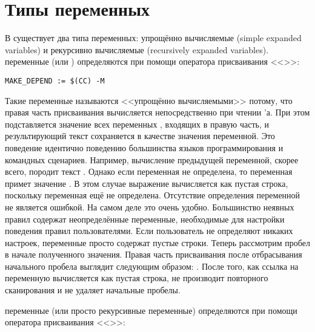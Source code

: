 \section{Типы переменных}
\label{var_types}

В \GNUmake{} существует два типа переменных: упрощённо вычисляемые
(simple expanded variables) и рекурсивно вычисляемые (recursively
expanded variables).  переменные (или
) определяются при помощи оператора
присваивания <<\command{:=}>>:

{\footnotesize
\begin{verbatim}
MAKE_DEPEND := $(CC) -M
\end{verbatim}
}

Такие переменные называются <<упрощённо вычисляемыми>> потому, что
правая часть присваивания вычисляется непосредственно при чтении
\Makefile{}'а. При этом подставляется значение всех переменных
\GNUmake{}, входящих в правую часть, и результирующий текст
сохраняется в качестве значения переменной. Это поведение идентично
поведению большинства языков программирования и командных сценариев.
Например, вычисление предыдущей переменной, скорее всего, породит
текст . Однако если переменная  не
определена, то переменная  примет значение
. В этом случае выражение 
вычисляется как пустая строка, поскольку переменная  ещё
не определена. Отсутствие определения переменной не является ошибкой.
На самом деле это очень удобно. Большинство неявных правил содержат
неопределённые переменные, необходимые для настройки поведения правил
пользователями. Если пользователь не определяют никаких настроек,
переменные просто содержат пустые строки. Теперь рассмотрим пробел в
начале полученного значения. Правая часть присваивания после
отбрасывания начального пробела выглядит следующим образом:
. После того, как ссылка на переменную
вычисляется как пустая строка, \GNUmake{} не производит повторного
сканирования и не удаляет начальные пробелы.

 переменные (или просто рекурсивные
переменные) определяются при помощи оператора присваивания
<<\command{=}>>:

